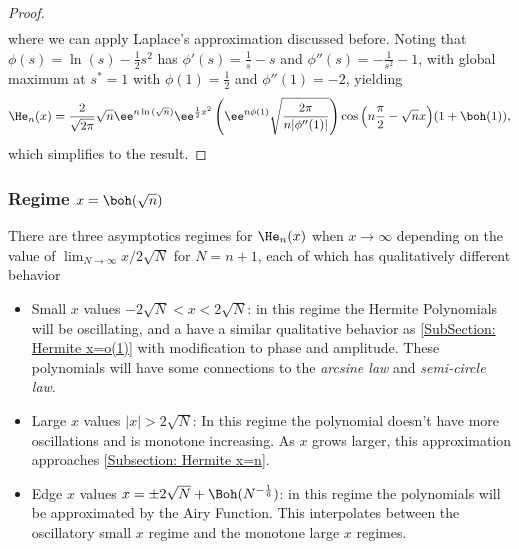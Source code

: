 {\begin{proof}
\begin{align}
	\end{align}
	where we can apply Laplace's approximation discussed before. Noting that $\phi(s) = \ln{(s)} - \frac{1}{2}s^2$ has $\phi'(s) = \frac{1}{s} - s$ and $\phi''(s) = -\frac{1}{s^2} - 1$, with global maximum at $s^* = 1$ with $\phi(1) = \frac{1}{2}$ and $\phi''(1) = -2$, yielding
	\begin{align}
		\He_n(x) = \frac{2}{\sqrt{2\pi}} \sqrt{n} \ee^{n\ln{(\sqrt{n})}} \ee^{\frac{1}{2}x^2}  \left( \ee^{n\phi(1)} \sqrt{\frac{2\pi}{n|\phi''(1)|}} \right) \cos{\left(n\frac{\pi}{2} - \sqrt{n}x\right)} (1+\boh(1)),
	\end{align}
	which simplifies to the result.
\end{proof}

\subsubsection{Regime $x = \boh(\sqrt{n})$}

There are three asymptotics regimes for $\He_n(x)$ when $x \rightarrow \infty$ depending on the value of $\lim_{N \rightarrow \infty} x/2\sqrt{N}$ for $N = n+1$, each of which has qualitatively different behavior
\begin{itemize}
	\item Small $x$ values $-2\sqrt{N} < x < 2\sqrt{N}$: in this regime the Hermite Polynomials will be oscillating, and a have a similar qualitative behavior as \ref{SubSection: Hermite x=o(1)} with modification to phase and amplitude. These polynomials will have some connections to the \textit{arcsine law} and \textit{semi-circle law}.
	\item Large $x$ values $|x| > 2\sqrt{N}$: In this regime the polynomial doesn't have more oscillations and is monotone increasing. As $x$ grows larger, this approximation approaches \ref{Subsection: Hermite x=n}.
	\item Edge $x$ values $x = \pm 2\sqrt{N} + \Boh(N^{-\frac{1}{6}})$: in this regime the polynomials will be approximated by the Airy Function. This interpolates between the oscillatory small $x$ regime and the monotone large $x$ regimes. 
\end{itemize} 

}
